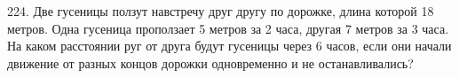 224. Две гусеницы ползут навстречу друг другу по дорожке, длина которой 18 метров. Одна гусеница проползает 5 метров за 2 часа, другая 7 метров за 3 часа. На каком расстоянии руг от друга будут гусеницы через 6 часов, если они начали движение от разных концов дорожки одновременно и не останавливались?\\
